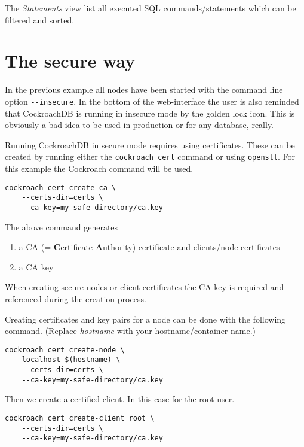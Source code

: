 The \emph{Statements} view list all executed SQL commands/statements which can be filtered and sorted. 

\section{The secure way}\label{chap:secure}
In the previous example all nodes have been started with the command line option \verb|--insecure|. In the bottom of the web-interface the user is also reminded that CockroachDB is running in insecure mode by the golden lock icon. This is obviously a bad idea to be used in production or for any database, really. 

\medskip
Running CockroachDB in secure mode requires using certificates. These can be created by running either the \verb|cockroach cert| command or using \verb|opensll|. For this example the Cockroach command will be used.

\begin{verbatim}
cockroach cert create-ca \ 
    --certs-dir=certs \
    --ca-key=my-safe-directory/ca.key
\end{verbatim}

The above command generates 
\begin{enumerate}
    \item a CA (= \textbf{C}ertificate \textbf{A}uthority) certificate and clients/node certificates
    \item a CA key 
\end{enumerate}

When creating secure nodes or client certificates the CA key is required and referenced during the creation process.

Creating certificates and key pairs for a node can be done with the following command. (Replace \emph{hostname} with your hostname/container name.)
\begin{verbatim}
cockroach cert create-node \ 
    localhost $(hostname) \
    --certs-dir=certs \
    --ca-key=my-safe-directory/ca.key
\end{verbatim}

Then we create a certified client. In this case for the root user.

\begin{verbatim}
cockroach cert create-client root \ 
    --certs-dir=certs \
    --ca-key=my-safe-directory/ca.key
\end{verbatim}


